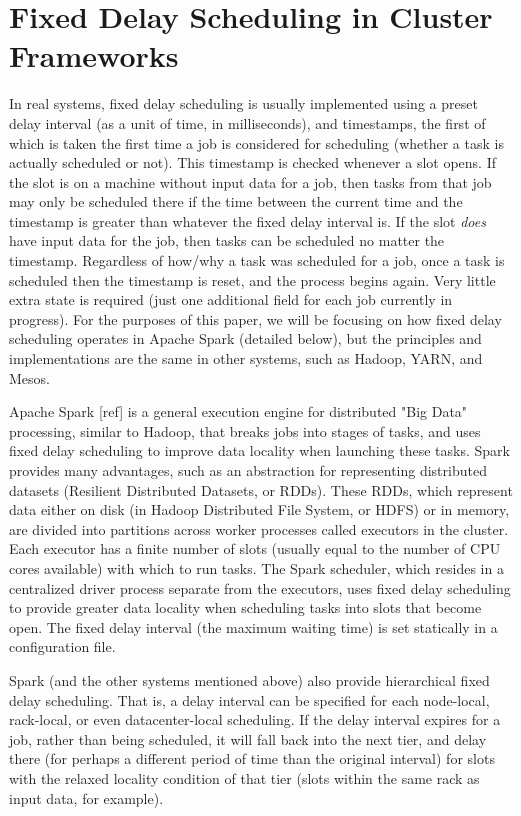 \section{Fixed Delay Scheduling in Cluster Frameworks}\label{sec:systems}

In real systems, fixed delay scheduling is usually implemented using a preset delay 
interval (as a unit of time, in milliseconds), and timestamps, the first of
which is taken the first time a job is considered for scheduling (whether a task is actually
scheduled or not).
This timestamp is checked whenever a slot opens. If the slot is on a machine
without input data for a job, then tasks from that job may only be scheduled there if
the time between the current time and the timestamp is greater than whatever the fixed delay
interval is. If the slot \textit{does} have input data for the job, then tasks can be scheduled
no matter the timestamp. Regardless of how/why a task was scheduled for a job, once a task
is scheduled then the timestamp is reset, and the process begins again. Very little extra
state is required (just one additional field for each job currently in progress). For the purposes
of this paper, we will be focusing on how fixed delay scheduling operates in Apache Spark (detailed
below), but the principles and implementations are the same in other systems, such as 
Hadoop, YARN, and Mesos.

Apache Spark [ref] is a general execution engine for distributed "Big Data" processing, 
similar to Hadoop, that breaks jobs into stages of tasks, and uses fixed delay scheduling to 
improve data locality when launching these tasks. Spark provides many advantages, such 
as an abstraction for representing distributed datasets (Resilient Distributed Datasets, 
or RDDs). These RDDs, which represent data either on disk (in Hadoop Distributed File 
System, or HDFS) or in memory, are divided into partitions across worker processes called 
executors in the cluster. Each executor has a finite number of slots (usually equal to the number 
of CPU cores available) with which to run 
tasks. The Spark scheduler, which resides in a centralized driver process separate from 
the executors, uses fixed delay scheduling to provide greater data locality when scheduling 
tasks into slots that become open. The fixed delay interval (the maximum waiting time) is set 
statically in a configuration file.

Spark (and the other systems mentioned above) also provide hierarchical fixed delay scheduling.
That is, a delay interval can be specified for each node-local, rack-local, or even datacenter-local
scheduling. If the delay interval expires for a job, rather than being scheduled, it will fall back
into the next tier, and delay there (for perhaps a different period of time than the original interval)
for slots with the relaxed locality condition of that tier (slots within the same rack as input data, for
example). 



